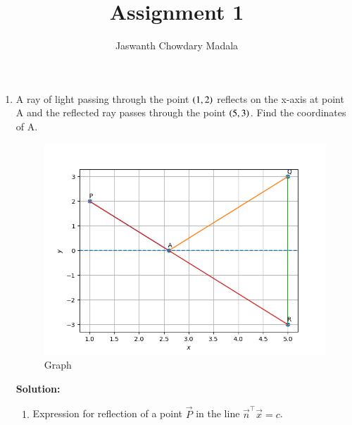 \documentclass[journal,12pt,twocolumn]{IEEEtran}
\begin{document}
\vspace{3cm}


\title{Assignment 1}
\author{Jaswanth Chowdary Madala}





\maketitle

\newpage


\bigskip

\renewcommand{\thefigure}{\theenumi}
\renewcommand{\thetable}{\theenumi}

\begin{enumerate}
\item A ray of light passing through the point $\left(1, 2\right)$ reflects on the x-axis at point A and the reflected ray passes through the point $\left(5, 3\right)$. Find the coordinates of A.

\begin{figure}[ht]
\centering
\includegraphics[width = \columnwidth]{"./figs/fig.png"}
\caption{Graph}
\label{fig:1}
\end{figure}

\textbf{Solution:} 
\begin{enumerate}
\item Expression for reflection of a point $\vec{P}$ in the line $\vec{n}^{\top}\vec{x} = c$.


\end{enumerate}
\end{enumerate}
\end{document}
